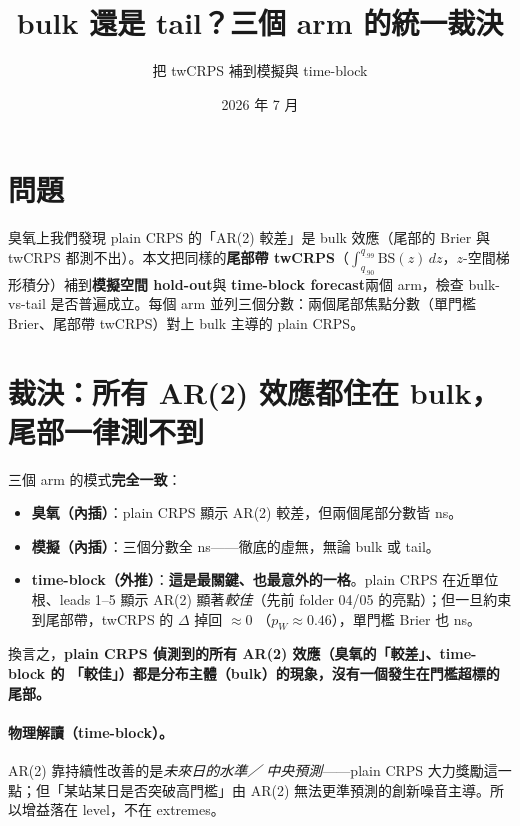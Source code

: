 \documentclass[12pt]{article}
\title{\textbf{bulk 還是 tail？三個 arm 的統一裁決}}
\author{把 twCRPS 補到模擬與 time-block}
\date{2026 年 7 月}
\begin{document}
\maketitle

\section*{問題}

臭氧上我們發現 plain CRPS 的「AR(2) 較差」是 bulk 效應（尾部的 Brier 與 twCRPS
都測不出）。本文把同樣的\textbf{尾部帶 twCRPS}（$\int_{q_{.90}}^{q_{.99}}
\mathrm{BS}(z)\,dz$，$z$-空間梯形積分）補到\textbf{模擬空間 hold-out}與
\textbf{time-block forecast}兩個 arm，檢查 bulk-vs-tail 是否普遍成立。每個 arm
並列三個分數：兩個尾部焦點分數（單門檻 Brier、尾部帶 twCRPS）對上 bulk 主導的
plain CRPS。

\bigskip


\section*{裁決：所有 AR(2) 效應都住在 bulk，尾部一律測不到}

三個 arm 的模式\textbf{完全一致}：

\begin{itemize}
  \item \textbf{臭氧（內插）}：plain CRPS 顯示 AR(2) 較差，但兩個尾部分數皆 ns。
  \item \textbf{模擬（內插）}：三個分數全 ns——徹底的虛無，無論 bulk 或 tail。
  \item \textbf{time-block（外推）}：\textbf{這是最關鍵、也最意外的一格}。plain
        CRPS 在近單位根、leads 1--5 顯示 AR(2) 顯著\emph{較佳}（先前 folder 04/05
        的亮點）；但一旦約束到尾部帶，twCRPS 的 $\Delta$ 掉回 $\approx 0$
        （$p_W\approx0.46$），單門檻 Brier 也 ns。
\end{itemize}

換言之，\textbf{plain CRPS 偵測到的所有 AR(2) 效應（臭氧的「較差」、time-block 的
「較佳」）都是分布主體（bulk）的現象，沒有一個發生在門檻超標的尾部。}

\paragraph{物理解讀（time-block）。}AR(2) 靠持續性改善的是\emph{未來日的水準／
中央預測}——plain CRPS 大力獎勵這一點；但「某站某日是否突破高門檻」由 AR(2)
無法更準預測的創新噪音主導。所以增益落在 level，不在 extremes。
\end{document}
